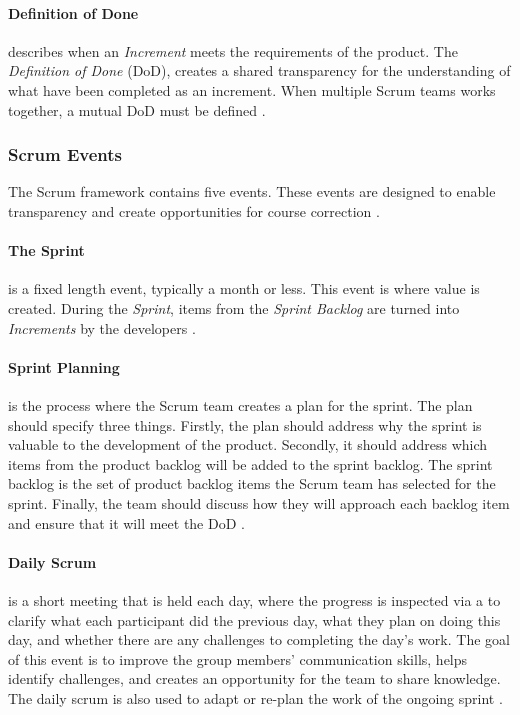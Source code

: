 \paragraph{Definition of Done}\label{par:definition-of-done}
describes when an \emph{Increment} meets the requirements of the product.
The \emph{Definition of Done} (DoD), creates a shared transparency for the understanding of what have been completed as an increment.
When multiple Scrum teams works together, a mutual DoD must be defined \cite{schwaber_sutherland_2022}.
\subsubsection{Scrum Events}
The Scrum framework contains five events. 
These events are designed to enable transparency and create opportunities for course correction \cite{schwaber_sutherland_2022}.

\paragraph{The Sprint}
is a fixed length event, typically a month or less.
This event is where value is created. 
During the \emph{Sprint}, items from the \emph{Sprint Backlog} are turned into \emph{Increments} by the developers \cite{schwaber_sutherland_2022}.

\paragraph{Sprint Planning}
is the process where the Scrum team creates a plan for the sprint.
The plan should specify three things. 
Firstly, the plan should address why the sprint is valuable to the development of the product. 
Secondly, it should address which items from the product backlog will be added to the sprint backlog. 
The sprint backlog is the set of product backlog items the Scrum team has selected for the sprint. 
Finally, the team should discuss how they will approach each backlog item and ensure that it will meet the DoD \cite{schwaber_sutherland_2022}.

\paragraph{Daily Scrum}
is a short meeting that is held each day, where the progress is inspected via a  to clarify what each participant did the previous day, what they plan on doing this day, and whether there are any challenges to completing the day's work.
The goal of this event is to improve the group members' communication skills, helps identify challenges, and creates an opportunity for the team to share knowledge.
The daily scrum is also used to adapt or re-plan the work of the ongoing sprint \cite{schwaber_sutherland_2022}.

